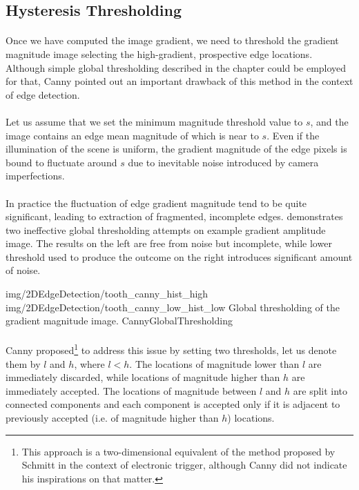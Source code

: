 \subsection{Hysteresis Thresholding}

\paragraph*{}
Once we have computed the image gradient, we need to threshold the gradient magnitude image selecting the high-gradient, prospective edge locations. Although simple global thresholding described in the  chapter could be employed for that, Canny pointed out an important drawback of this method in the context of edge detection.

\paragraph*{}
Let us assume that we set the minimum magnitude threshold value to $s$, and the image contains an edge mean magnitude of which is near to $s$. Even if the illumination of the scene is uniform, the gradient magnitude of the edge pixels is bound to fluctuate around $s$ due to inevitable noise introduced by camera imperfections.

\paragraph*{}
In practice the fluctuation of edge gradient magnitude tend to be quite significant, leading to extraction of fragmented, incomplete edges.  demonstrates two ineffective global thresholding attempts on example gradient amplitude image. The results on the left are free from noise but incomplete, while lower threshold used to produce the outcome on the right introduces significant amount of noise.

\twoFigures
{img/2DEdgeDetection/tooth_canny_hist_high}
{img/2DEdgeDetection/tooth_canny_low_hist_low}
{Global thresholding of the gradient magnitude image.}
{CannyGlobalThresholding}
{\basicWidth}

\paragraph*{}
Canny proposed\footnote{This approach is a two-dimensional equivalent of the method proposed\cite{Schmitt38} by Schmitt in the context of electronic trigger, although Canny did not indicate his inspirations on that matter.} to address this issue by setting two thresholds, let us denote them by $l$ and $h$, where $l < h$. The locations of magnitude lower than $l$ are immediately discarded, while locations of magnitude higher than $h$ are immediately accepted. The locations of magnitude between $l$ and $h$ are split into connected components and each component is accepted only if it is adjacent to previously accepted (i.e. of magnitude higher than $h$) locations.

